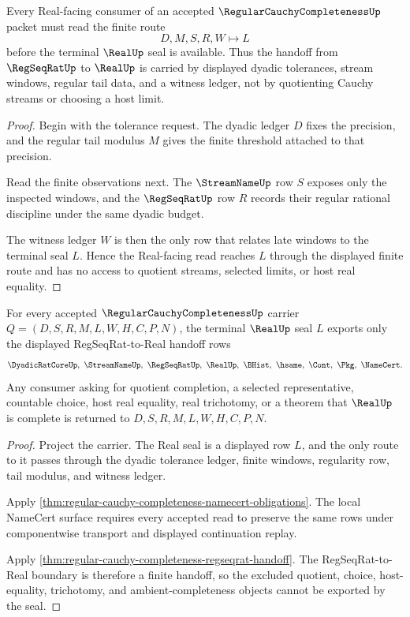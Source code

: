 \begin{theorem}
\label{thm:regular-cauchy-completeness-regseqrat-handoff}
Every Real-facing consumer of an accepted $\RegularCauchyCompletenessUp$ packet must read the finite route
$$
D,M,S,R,W \longmapsto L
$$
before the terminal $\RealUp$ seal is available. Thus the handoff from $\RegSeqRatUp$ to $\RealUp$ is carried by displayed dyadic tolerances, stream windows, regular tail data, and a witness ledger, not by quotienting Cauchy streams or choosing a host limit.
\end{theorem}
\begin{proof}
Begin with the tolerance request. The dyadic ledger $D$ fixes the precision, and the regular tail modulus $M$ gives the finite threshold attached to that precision.

Read the finite observations next. The $\StreamNameUp$ row $S$ exposes only the inspected windows, and the $\RegSeqRatUp$ row $R$ records their regular rational discipline under the same dyadic budget.

The witness ledger $W$ is then the only row that relates late windows to the terminal seal $L$. Hence the Real-facing read reaches $L$ through the displayed finite route and has no access to quotient streams, selected limits, or host real equality.
\end{proof}

\begin{theorem}
\label{thm:regular-cauchy-completeness-real-seal}
For every accepted $\RegularCauchyCompletenessUp$ carrier $Q=(D,S,R,M,L,W,H,C,P,N)$, the terminal $\RealUp$ seal $L$ exports only the displayed RegSeqRat-to-Real handoff rows
$$
\DyadicRatCoreUp,\ \StreamNameUp,\ \RegSeqRatUp,\ \RealUp,\ \BHist,\ \hsame,\ \Cont,\ \Pkg,\ \NameCert .
$$
Any consumer asking for quotient completion, a selected representative, countable choice, host real equality, real trichotomy, or a theorem that $\RealUp$ is complete is returned to $D,S,R,M,L,W,H,C,P,N$.
\end{theorem}
\begin{proof}
Project the carrier. The Real seal is a displayed row $L$, and the only route to it passes through the dyadic tolerance ledger, finite windows, regularity row, tail modulus, and witness ledger.

Apply \autoref{thm:regular-cauchy-completeness-namecert-obligations}. The local NameCert surface requires every accepted read to preserve the same rows under componentwise transport and displayed continuation replay.

Apply \autoref{thm:regular-cauchy-completeness-regseqrat-handoff}. The RegSeqRat-to-Real boundary is therefore a finite handoff, so the excluded quotient, choice, host-equality, trichotomy, and ambient-completeness objects cannot be exported by the seal.
\end{proof}

